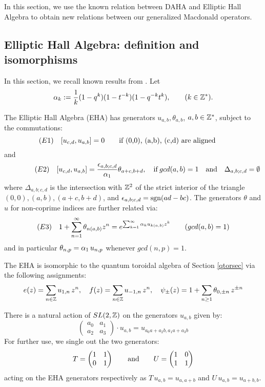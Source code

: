 In this section, we use the known relation between DAHA and Elliptic Hall Algebra
to obtain new relations between our generalized Macdonald operators. 

\subsection{Elliptic Hall Algebra: definition and isomorphisms}

In this section, we recall known results from \cite{BS,SCHIFFEHA}.
Let
\begin{equation}\label{defalpha}
{\alpha}_k:=\frac{1}{k}(1-q^k)(1-t^{-k})(1-q^{-k}t^k) ,\qquad (k\in {\mathbb Z}^*) .
\end{equation}

\begin{defn}\label{EHAdefn}
The Elliptic Hall Algebra (EHA) has generators $u_{a,b},\theta_{a,b}$, $a,b\in {\mathbb Z}^*$,
subject to the commutations:
$$\!\!\!\!\!\!\!\!\!\!(E1)\quad [u_{c,d},u_{a,b}]=0 \qquad \hbox{\rm if (0,0), (a,b), (c,d)  are aligned}
$$
and
$$\qquad\qquad (E2)\quad  [u_{c,d},u_{a,b}]=\frac{\epsilon_{a,b;c,d}}{{\alpha}_1}\theta_{a+c,b+d}, \quad {\rm if}\, gcd(a,b)=1\quad 
{\rm and}\quad \Delta_{a,b;c,d}=\emptyset$$
where $\Delta_{a,b;c,d}$ is the intersection with ${\mathbb Z}^2$ of the strict interior of the triangle $(0,0),(a,b),(a+c,b+d)$,
and $\epsilon_{a,b;c,d}={\rm sgn}(ad-bc)$.
The generators $\theta$ and $u$ for non-coprime indices are further related via:
$$(E3)\quad 1+\sum_{n=1}^\infty \theta_{n(a,b)} z^n =e^{\sum_{k=1}^\infty {\alpha}_k u_{k(a,b)} z^k}\qquad (gcd(a,b)=1)$$
and in particular $\theta_{n,p}={\alpha}_1\,u_{n,p}$ whenever $gcd(n,p)=1$.
\end{defn}

The EHA is isomorphic to the quantum toroidal algebra of Section \ref{qtorsec} via the following
assignments:
\begin{equation}\label{ehatoqtor}
e(z)=\sum_{n\in{\mathbb Z}} u_{1,n} \,z^n,\quad f(z)=\sum_{n\in{\mathbb Z}} u_{-1,n} \,z^n,\quad 
\psi_{\pm}(z)=1+\sum_{n\geq 1} \theta_{0,\pm n}\, z^{\pm n}
\end{equation}

There is a natural action of $SL(2,{\mathbb Z})$ on the generators $u_{a,b}$ given by:
$$ \begin{pmatrix} a_0 & a_1 \\ a_2 & a_3 \end{pmatrix}\cdot u_{a,b}=u_{a_0 a+a_2 b,a_1 a+a_3 b}$$
For further use, we single out the two generators:
\begin{equation}\label{defTU}
T=\begin{pmatrix} 1 & 1 \\ 0 & 1 \end{pmatrix}\qquad {\rm and}\qquad U=\begin{pmatrix} 1 & 0 \\ 1 & 1 \end{pmatrix}
\end{equation}
acting on the EHA generators respectively as $T \, u_{a,b}=u_{a,a+b}$ and $U\, u_{a,b}=u_{a+b,b}$.

